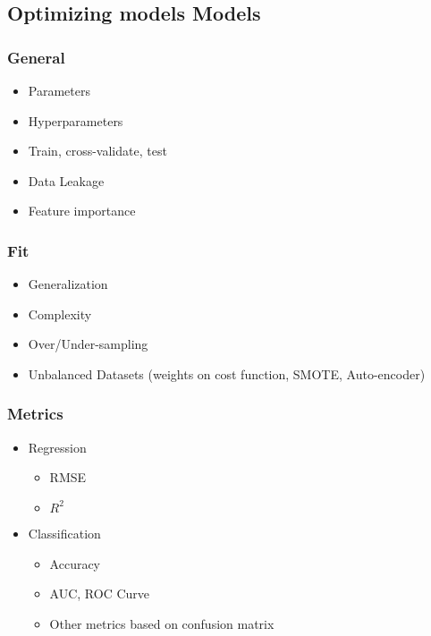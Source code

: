 \subsection{Optimizing models Models}

\subsubsection{General}

\begin{itemize}
   \item Parameters
   \item Hyperparameters
   \item Train, cross-validate, test
   \item Data Leakage
   \item Feature importance
\end{itemize}


\subsubsection{Fit}

\begin{itemize}
   \item Generalization
   \item Complexity
   \item Over/Under-sampling
   \item Unbalanced Datasets (weights on cost function, SMOTE, Auto-encoder)
\end{itemize}


\subsubsection{Metrics}

\begin{itemize}
   \item Regression
   \begin{itemize}
      \item RMSE
      \item $R^2$
   \end{itemize}

   \item Classification
   \begin{itemize}
      \item Accuracy
      \item AUC, ROC Curve
      \item Other metrics based on confusion matrix
   \end{itemize}
\end{itemize}

